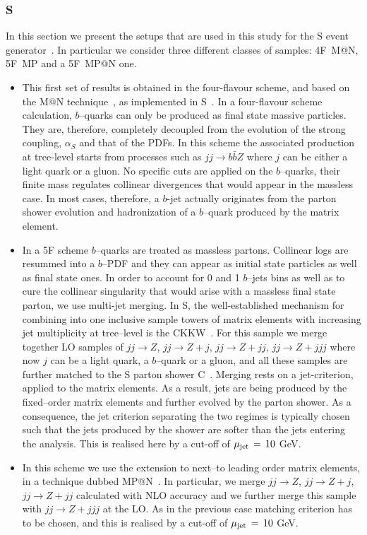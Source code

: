 \documentclass[11pt]{cernrep}
\makeatletter
\newcommand{\Sherpa}{S\protect\scalebox{0.8}{HERPA}\xspace}
\newcommand{\CSS}{C\protect\scalebox{0.8}{SS}\xspace}
\newcommand{\MCatNLO}{M\protect\scalebox{0.8}{C}@N\protect\scalebox{0.8}{LO}\xspace}
\newcommand{\MEPS}{M\scalebox{0.8}{E}P\scalebox{0.8}{S}\xspace}
\newcommand{\MEPSatNLO}{M\scalebox{0.8}{E}P\scalebox{0.8}{S}@N\protect\scalebox{0.8}{LO}\xspace}
\makeatother
\begin{document}
\subsubsection{\protect\Sherpa }
In this section we present the setups that are used in this study for the \Sherpa event
generator~\cite{Gleisberg:2008ta}. In particular we consider three different
classes of samples: 4F~\MCatNLO, 5F~\MEPS and a 5F~\MEPSatNLO one.
\begin{itemize}
\item[4F \MCatNLO : ]{ This first set of results is obtained in the
  four-flavour scheme, and based on the \MCatNLO
  technique~\cite{Frixione:2002ik}, as implemented in
  \Sherpa~\cite{Hoeche:2011fd}. In a four-flavour scheme calculation,
  $b$--quarks can only be produced as final state massive particles. They
  are, therefore, completely decoupled from the evolution of the strong
  coupling, $\alpha_S$ and that of the PDFs. In this scheme the associated
  production at tree-level starts from processes such as $jj \to b\bar{b}Z$
  where $j$ can be either a light quark or a gluon. No specific cuts are
  applied on the $b$--quarks, their finite mass regulates collinear
  divergences that would appear in the massless case. In most cases,
  therefore, a $b$-jet actually originates from the parton shower evolution
  and hadronization of a $b$--quark produced by the matrix element.}
\item[5F~\MEPS :]{ In a 5F scheme $b$--quarks are treated as massless
  partons. Collinear logs are resummed into a $b$--PDF and they can appear as
  initial state particles as well as final state ones. In order to account
  for 0 and 1 $b$--jets bins as well as to cure the collinear singularity
  that would arise with a massless final state parton, we use multi-jet
  merging. In \Sherpa, the well-established mechanism for combining into one
  inclusive sample towers of matrix elements with increasing jet multiplicity
  at tree--\-level is the CKKW~\cite{Catani:2001cc}.  For this sample we
  merge together LO samples of $jj \to Z$, $jj \to Z+j$, $jj \to Z+jj$, $jj
  \to Z+jjj$ where now $j$ can be a light quark, a $b$--quark or a gluon, and
  all these samples are further matched to the \Sherpa parton shower
  \CSS~\cite{Schumann:2007mg}.  Merging rests on a jet-criterion, applied to
  the matrix elements.  As a result, jets are being produced by the
  fixed--order matrix elements and further evolved by the parton shower.  As
  a consequence, the jet criterion separating the two regimes is typically
  chosen such that the jets produced by the shower are softer than the jets
  entering the analysis.  This is realised here by a cut-off of $\mu_{\rm
    jet}\,=\, 10 $ GeV.}
	
\item[5F~\MEPSatNLO : ]{ In this scheme we use the extension to next--to
  leading order matrix elements, in a technique dubbed
  \MEPSatNLO~\cite{Hoeche:2012yf}.  In particular, we merge $jj \to Z$, $jj
  \to Z+j$, $jj \to Z+jj$ calculated with NLO accuracy and we further merge
  this sample with $jj \to Z+jjj$ at the LO.  As in the previous case
  matching criterion has to be chosen, and this is realised by a cut-off of
  $\mu_{\rm jet}\,=\, 10 $ GeV.}
\end{itemize}
\end{document}
